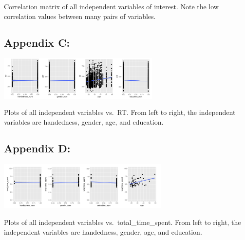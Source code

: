 \documentclass[
]{article}
\begin{document}
Correlation matrix of all independent variables of interest. Note the
low correlation values between many pairs of variables.

\hypertarget{appendix-c}{%
\subsection{Appendix C:}\label{appendix-c}}

\begin{center}\includegraphics[width=3.17in]{Appendix_A} \end{center}

Plots of all independent variables vs.~RT. From left to right, the
independent variables are handedness, gender, age, and education.

\hypertarget{appendix-d}{%
\subsection{Appendix D:}\label{appendix-d}}

\begin{center}\includegraphics[width=3.36in]{Appendix_B} \end{center}

Plots of all independent variables vs.~total\_time\_spent. From left to
right, the independent variables are handedness, gender, age, and
education.
\end{document}

